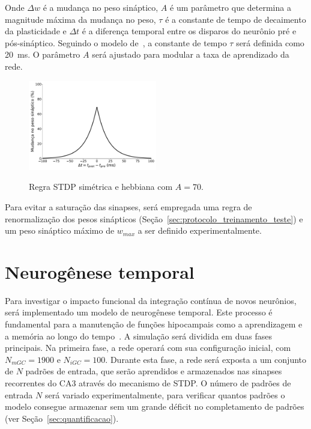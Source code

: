 Onde $\Delta w$ é a mudança no peso sináptico, $A$ é um parâmetro que determina a magnitude máxima da mudança no peso, $\tau$ é a
constante de tempo de decaimento da plasticidade e $\Delta t$ é a diferença temporal entre os disparos do neurônio pré e
pós-sináptico. Seguindo o modelo de~\cite{kopsickFormation2024}, a constante de tempo $\tau$ será definida como
\SI{20}{\milli\second}. O parâmetro $A$ será ajustado para modular a taxa de aprendizado da rede.

\begin{figure}[H]
    \centering
    \caption{Regra STDP simétrica e hebbiana com $A = 70$.}
    \includegraphics[width=0.5\textwidth]{figuras/symmetric_stdp}
    \label{fig:symmetric_stdp}
\end{figure}

Para evitar a saturação das sinapses, será empregada uma regra de renormalização dos pesos sinápticos
(Seção~\ref{sec:protocolo_treinamento_teste}) e um peso sináptico máximo de $w_{max}$ a ser definido experimentalmente.

\section{Neurogênese temporal}

Para investigar o impacto funcional da integração contínua de novos neurônios, será implementado um modelo de neurogênese
temporal. Este processo é fundamental para a manutenção de funções hipocampais como a aprendizagem e a memória ao longo do
tempo~\cite{aimoneRegulation2014, berdugo-vegaSharpening2023}. A simulação será dividida em duas fases principais. Na primeira
fase, a rede operará com sua configuração inicial, com $N_{mGC} = 1900$ e $N_{iGC} = 100$. Durante esta fase, a rede será exposta
a um conjunto de $N$ padrões de entrada, que serão aprendidos e armazenados nas sinapses recorrentes do CA3 através do mecanismo
de STDP. O número de padrões de entrada $N$ será variado experimentalmente, para verificar quantos padrões o modelo consegue
armazenar sem um grande déficit no completamento de padrões (ver Seção~\ref{sec:quantificacao}).

